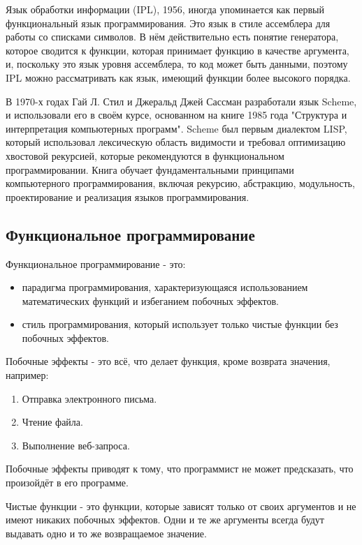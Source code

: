 Язык обработки информации (IPL), 1956, иногда упоминается как первый функциональный язык программирования.
Это язык в стиле ассемблера для работы со списками символов. \cite{ModelsofMyLife}
В нём действительно есть понятие генератора, которое сводится к функции, которая принимает функцию в качестве аргумента, и, поскольку это язык уровня ассемблера, то код может быть данными, поэтому IPL можно рассматривать как язык, имеющий функции более высокого порядка.

В 1970-х годах Гай Л. Стил и Джеральд Джей Сассман разработали язык Scheme, и использовали его в своём курсе, основанном на книге 1985 года "Структура и интерпретация компьютерных программ"\cite{SICP}. Scheme был первым диалектом LISP, который использовал лексическую область видимости и требовал оптимизацию хвостовой рекурсией, которые рекомендуются в функциональном программировании. Книга обучает фундаментальными принципами компьютерного программирования, включая рекурсию, абстракцию, модульность, проектирование и реализация языков программирования.

\subsection{Функциональное программирование}

Функциональное программирование - это:

\begin{itemize}
	\item парадигма программирования, характеризующаяся использованием математических функций и избеганием побочных эффектов.
	\item стиль программирования, который использует только чистые функции без побочных эффектов.
\end{itemize}

Побочные эффекты - это всё, что делает функция, кроме возврата значения, например:

\begin{enumerate}
	\item Отправка электронного письма.
	\item Чтение файла.
	\item Выполнение веб-запроса.
\end{enumerate}

Побочные эффекты приводят к тому, что программист не может предсказать, что произойдёт в его программе.

Чистые функции - это функции, которые зависят только от своих аргументов и не имеют никаких побочных эффектов. 
Одни и те же аргументы всегда будут выдавать одно и то же возвращаемое значение. 

